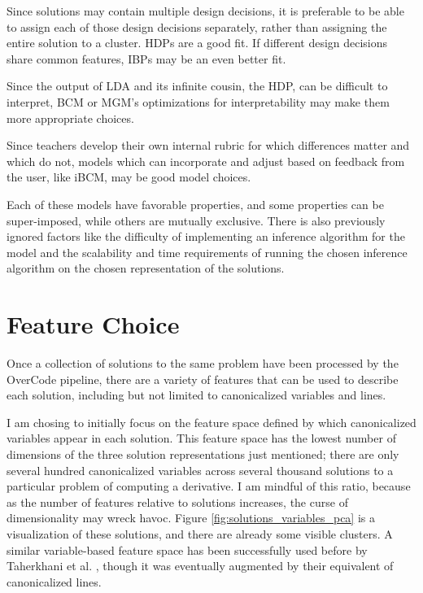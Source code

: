 Since solutions may contain multiple design decisions, it is preferable to be able to assign each of those design decisions separately, rather than assigning the entire solution to a cluster. HDPs are a good fit. If different design decisions share common features, IBPs may be an even better fit.

Since the output of LDA and its infinite cousin, the HDP, can be difficult to interpret, BCM or MGM's optimizations for interpretability may make them more appropriate choices.

Since teachers develop their own internal rubric for which differences matter and which do not, models which can incorporate and adjust based on feedback from the user, like iBCM, may be good model choices.

Each of these models have favorable properties, and some properties can be super-imposed, while others are mutually exclusive. There is also previously ignored factors like the difficulty of implementing an inference algorithm for the model and the scalability and time requirements of running the chosen inference algorithm on the chosen representation of the solutions.

\section{Feature Choice}

Once a collection of solutions to the same problem have been processed by the OverCode pipeline, there are a variety of features that can be used to describe each solution, including but not limited to canonicalized variables and lines. 

I am chosing to initially focus on the feature space defined by which canonicalized variables appear in each solution. This feature space has the lowest number of dimensions of the three solution representations just mentioned; there are only several hundred canonicalized variables across several thousand solutions to a particular problem of computing a derivative. I am mindful of this ratio, because as the number of features relative to solutions increases, the curse of dimensionality may wreck havoc. Figure \ref{fig:solutions_variables_pca} is a visualization of these solutions, and there are already some visible clusters. A similar variable-based feature space has been successfully used before by Taherkhani et al. \cite{taherkhani13}, though it was eventually augmented by their equivalent of canonicalized lines.


